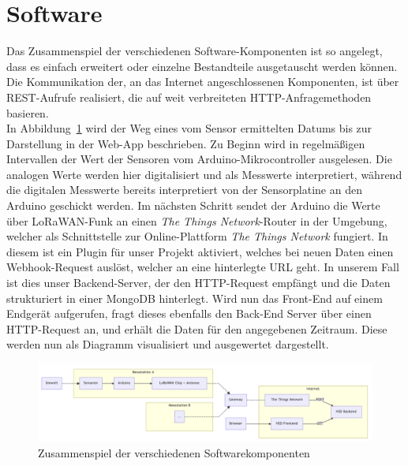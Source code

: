 \documentclass{article}
\begin{document}
\newpage

\section{Software}
Das Zusammenspiel der verschiedenen Software-Komponenten ist so angelegt, dass es einfach erweitert oder einzelne Bestandteile ausgetauscht werden können.
Die Kommunikation der, an das Internet angeschlossenen Komponenten, ist über REST-Aufrufe realisiert, die auf weit verbreiteten HTTP-Anfragemethoden basieren.\\

In Abbildung~\ref{fig:software_structure} wird der Weg eines vom Sensor ermittelten Datums bis zur Darstellung in der Web-App beschrieben.
Zu Beginn wird in regelmäßigen Intervallen der Wert der Sensoren vom Arduino-Mikrocontroller ausgelesen.
Die analogen Werte werden hier digitalisiert und als Messwerte interpretiert, während die digitalen Messwerte bereits interpretiert von der Sensorplatine an den Arduino geschickt werden.
Im nächsten Schritt sendet der Arduino die Werte über LoRaWAN-Funk an einen \textit{The Things Network}-Router in der Umgebung, welcher als Schnittstelle zur Online-Plattform \textit{The Things Network} fungiert.
In diesem ist ein Plugin für unser Projekt aktiviert, welches bei neuen Daten einen Webhook-Request auslöst, welcher an eine hinterlegte URL geht.
In unserem Fall ist dies unser Backend-Server, der den HTTP-Request empfängt und die Daten strukturiert in einer MongoDB hinterlegt.
Wird nun das Front-End auf einem Endgerät aufgerufen, fragt dieses ebenfalls den Back-End Server über einen HTTP-Request an, und erhält die Daten für den angegebenen Zeitraum.
Diese werden nun als Diagramm visualisiert und ausgewertet dargestellt.

\begin{figure}
    \centering
    \includegraphics[width=\textwidth]{images/Software_structure}
    \caption{Zusammenspiel der verschiedenen Softwarekomponenten}
    \label{fig:software_structure}
\end{figure}

\end{document}
